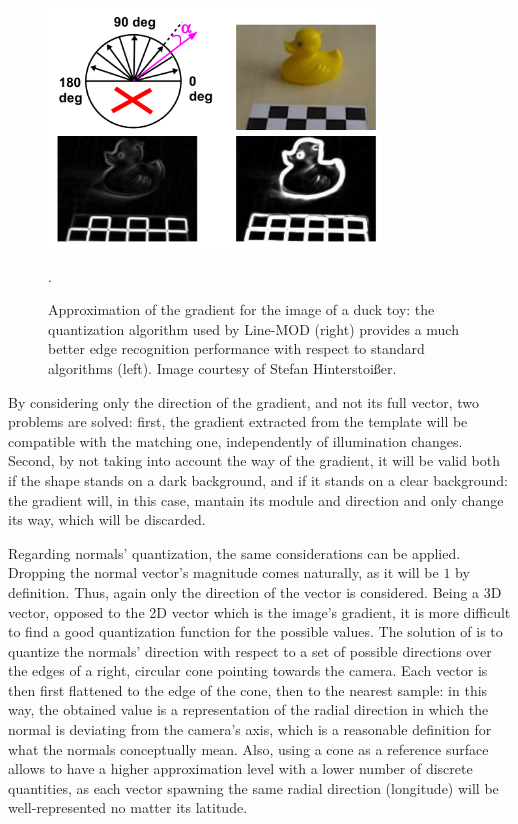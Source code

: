\begin{figure}[htbp]
\centering
\includegraphics[height=2.5in]{./Graphics/duck-gradient}
\caption{Approximation of the gradient for the image of a duck toy:
  the quantization algorithm used by Line-MOD (right) provides a
  much better edge recognition performance with respect to standard
  algorithms (left). Image courtesy of Stefan Hinterstoi\ss er. \label{fig:duck-gradient}}.
\end{figure}

By considering only the direction of the gradient, and not its
full vector, two problems are solved: first, the gradient extracted
from the template will be compatible with the matching one,
independently of illumination changes. Second, by not taking into
account the way of the gradient, it will be valid both if the shape
stands on a dark background, and if it stands on a clear background:
the gradient will, in this case, mantain its module and direction and
only change its way, which will be discarded.

Regarding normals' quantization, the same considerations can be
applied. Dropping the normal vector's magnitude comes naturally, as
it will be $1$ by definition. Thus, again only the direction of the vector is
considered. Being a 3D vector, opposed to the 2D vector which is the
image's gradient, it is more difficult to find a good quantization function
for the possible values. The solution of \cite{linemod-paper} is to
quantize the normals' direction with respect to a set of possible
directions over the edges of a right, circular cone pointing towards
the camera. Each vector is then first flattened to the edge of the
cone, then to the nearest sample: in this way, the obtained value
is a representation of the radial direction in which the normal is deviating from the
camera's axis, which is a reasonable definition for what the normals
conceptually mean. Also, using a cone as a reference surface allows to
have a higher approximation level with a lower number of discrete
quantities, as each vector spawning the same radial direction
(longitude) will be well-represented no matter its latitude.

